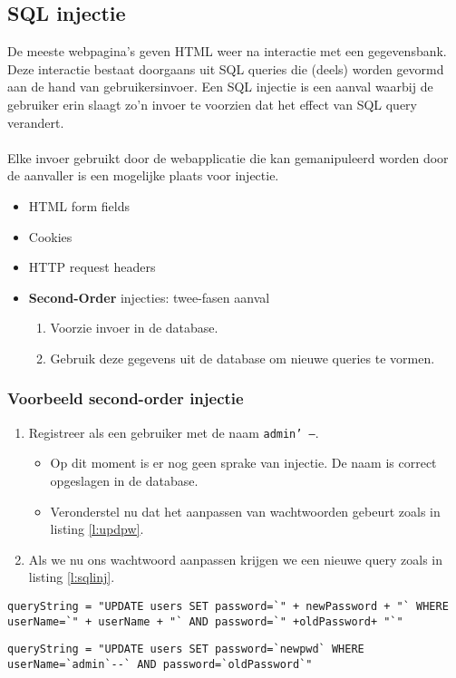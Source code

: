 \documentclass[../main.tex]{subfiles}
\begin{document}
\subsection{SQL injectie}
De meeste webpagina's geven HTML weer na interactie met een gegevensbank. Deze interactie bestaat doorgaans uit SQL queries die (deels) worden gevormd aan de hand van gebruikersinvoer. Een SQL injectie is een aanval waarbij de gebruiker erin slaagt zo'n invoer te voorzien dat het effect van SQL query verandert.
\\\\
Elke invoer gebruikt door de webapplicatie die kan gemanipuleerd worden door de aanvaller is een mogelijke plaats voor injectie.
\begin{itemize}
	\item HTML form fields
	\item Cookies
	\item HTTP request headers
	\item \textbf{Second-Order} injecties: twee-fasen aanval
	\begin{enumerate}
		\item Voorzie invoer in de database.
		\item Gebruik deze gegevens uit de database om nieuwe queries te vormen.
	\end{enumerate}
\end{itemize}

\subsubsection{Voorbeeld second-order injectie}
\begin{enumerate}
	\item Registreer als een gebruiker met de naam \texttt{admin' --}.
	\begin{itemize}
		\item Op dit moment is er nog geen sprake van injectie. De naam is correct opgeslagen in de database.
		\item Veronderstel nu dat het aanpassen van wachtwoorden gebeurt zoals in listing \ref{l:updpw}.
	\end{itemize}
	\item Als we nu ons wachtwoord aanpassen krijgen we een nieuwe query zoals in listing \ref{l:sqlinj}.
\end{enumerate}
\begin{lstlisting}[caption=Updaten wachtwoord, label=l:updpw]
queryString = "UPDATE users SET password=`" + newPassword + "` WHERE userName=`" + userName + "` AND password=`" +oldPassword+ "`"
\end{lstlisting}
\begin{lstlisting}[caption=SQL Injection, label=l:sqlinj]
queryString = "UPDATE users SET password=`newpwd` WHERE userName=`admin`--` AND password=`oldPassword`"
\end{lstlisting}
\end{document}
